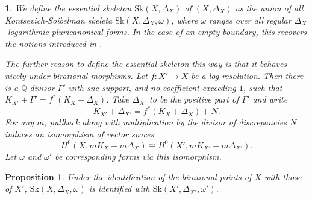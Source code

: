 \documentclass{amsart}%
\numberwithin{equation}{subsection}
\theoremstyle{plain2}
\newtheorem{prop}[equation]{Proposition}
\theoremstyle{definition2}
\theoremstyle{stepstyle}
\theoremstyle{point}
\theoremstyle{subpoint}
\newtheorem{subpoint}[equation]{}%
\newcommand{\spa}[1]{\begin{subpoint}#1\end{subpoint}}           %
\newcommand{\Sk}{\mathrm{Sk}}
\begin{document}
\spa{We define the essential skeleton $\Sk(X,\Delta_X)$ of $(X,\Delta_X)$ as the union of all Kontsevich-Soibelman skeleta $\Sk(X, \Delta_X,\omega)$, where $\omega$ ranges over all regular $\Delta_X$-logarithmic pluricanonical forms. In the case of an empty boundary, this recovers the notions introduced in \cite{MustataNicaise}.

The further reason to define the essential skeleton this way is that it behaves nicely under birational morphisms. Let $f \colon X'\to X$ be a log resolution. Then there is a $\mathbb{Q}$-divisor $\Gamma'$ with snc support, and no coefficient exceeding $1$, such that $K_{X'}+\Gamma' = f^*(K_X+\Delta_X)$. Take $\Delta_{X'}$ to be the positive part of $\Gamma'$ and write $$K_{X'}+\Delta_{X'}= f^*(K_{X}+\Delta_X)+N.$$ For any $m$, pullback along with multiplication by the divisor of discrepancies $N$ induces an isomorphism of vector spaces \begin{equation} \label{equ isomo forms log resolution}
H^0(X, mK_{X}+m\Delta_X) \cong H^0(X', mK_{X'}+m\Delta_{X'}).
\end{equation} Let $\omega$ and $\omega'$ be corresponding forms via this isomorphism.}
\begin{prop} \label{prop birational invariance essential skeleton for pairs}
Under the identification of the birational points of $X$ with those of $X'$, $\Sk(X, \Delta_X,\omega)$ is identified with $\Sk(X', \Delta_{X'},\omega')$.
\end{prop}
\end{document}
